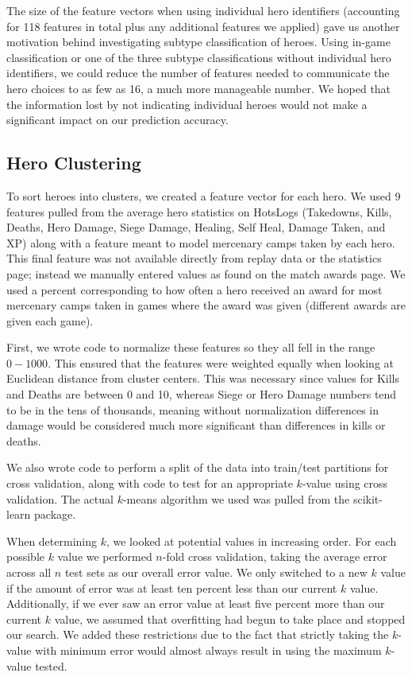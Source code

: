 \documentclass[11pt,letterpaper]{article}
\begin{document}
The size of the feature vectors when using individual hero identifiers (accounting for 118 features in total plus any additional features we applied) gave us another motivation behind investigating subtype classification of heroes. Using in-game classification or one of the three subtype classifications without individual hero identifiers, we could reduce the number of features needed to communicate the hero choices to as few as 16, a much more manageable number. We hoped that the information lost by not indicating individual heroes would not make a significant impact on our prediction accuracy.

\subsection{Hero Clustering}

To sort heroes into clusters, we created a feature vector for each hero. We used 9 features pulled from the average hero statistics on HotsLogs (Takedowns, Kills, Deaths, Hero Damage, Siege Damage, Healing, Self Heal, Damage Taken, and XP) along with a feature meant to model mercenary camps taken by each hero. This final feature was not available directly from replay data or the statistics page; instead we manually entered values as found on the match awards page. We used a percent corresponding to how often a hero received an award for most mercenary camps taken in games where the award was given (different awards are given each game). 

First, we wrote code to normalize these features so they all fell in the range $0-1000$. This ensured that the features were weighted equally when looking at Euclidean distance from cluster centers. This was necessary since values for Kills and Deaths are between 0 and 10, whereas Siege or Hero Damage numbers tend to be in the tens of thousands, meaning without normalization differences in damage would be considered much more significant than differences in kills or deaths.

We also wrote code to perform a split of the data into train/test partitions for cross validation, along with code to test for an appropriate $k$-value using cross validation. The actual $k$-means algorithm we used was pulled from the scikit-learn package.

When determining $k$, we looked at potential values in increasing order. For each possible $k$ value we performed $n$-fold cross validation, taking the average error across all $n$ test sets as our overall error value. We only switched to a new $k$ value if the amount of error was at least ten percent less than our current $k$ value. Additionally, if we ever saw an error value at least five percent more than our current $k$ value, we assumed that overfitting had begun to take place and stopped our search. We added these restrictions due to the fact that strictly taking the $k$-value with minimum error would almost always result in using the maximum $k$-value tested.
\end{document}
